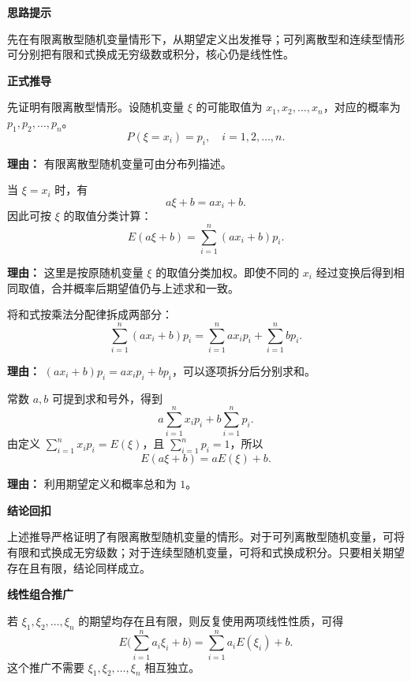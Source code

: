 \begin{proofbox}
	\textbf{\textcolor{CProof}{思路提示}}

	先在有限离散型随机变量情形下，从期望定义出发推导；可列离散型和连续型情形可分别把有限和式换成无穷级数或积分，核心仍是线性性。

	\medskip
	\textbf{\textcolor{CProof}{正式推导}}
	\begin{description}[style=nextline, leftmargin=2.8em, labelsep=0.5em, itemsep=0.55em]
		\item[\textbf{步骤一（设分布列）：}] 先证明有限离散型情形。设随机变量 $\xi$ 的可能取值为 $x_1,x_2,\dots,x_n$，对应的概率为 $p_1,p_2,\dots,p_n$。
		      \[
			      P(\xi=x_i)=p_i,\quad i=1,2,\dots,n.
		      \]
		      \par\textbf{理由：} 有限离散型随机变量可由分布列描述。

		\item[\textbf{步骤二（按原变量取值分类）：}] 当 $\xi=x_i$ 时，有
		      \[
			      a\xi+b=ax_i+b.
		      \]
		      因此可按 $\xi$ 的取值分类计算：
		      \[
			      E(a\xi+b)=\sum_{i=1}^{n}(ax_i+b)p_i.
		      \]
		      \par\textbf{理由：} 这里是按原随机变量 $\xi$ 的取值分类加权。即使不同的 $x_i$ 经过变换后得到相同取值，合并概率后期望值仍与上述求和一致。

		\item[\textbf{步骤三（拆分求和）：}] 将和式按乘法分配律拆成两部分：
		      \[
			      \sum_{i=1}^{n}(ax_i+b)p_i
			      =
			      \sum_{i=1}^{n}a x_i p_i+\sum_{i=1}^{n}b p_i.
		      \]
		      \par\textbf{理由：} $(ax_i+b)p_i = a x_i p_i+bp_i$，可以逐项拆分后分别求和。

		\item[\textbf{步骤四（化简代回）：}] 常数 $a,b$ 可提到求和号外，得到
		      \[
			      a\sum_{i=1}^{n}x_i p_i + b\sum_{i=1}^{n}p_i.
		      \]
		      由定义 $\sum_{i=1}^{n} x_i p_i = E(\xi)$，且 $\sum_{i=1}^{n} p_i = 1$，所以
		      \[
			      E(a\xi+b)=aE(\xi)+b.
		      \]
		      \par\textbf{理由：} 利用期望定义和概率总和为 $1$。
	\end{description}

	\medskip
	\textbf{\textcolor{CProof}{结论回扣}}

	上述推导严格证明了有限离散型随机变量的情形。对于可列离散型随机变量，可将有限和式换成无穷级数；对于连续型随机变量，可将和式换成积分。只要相关期望存在且有限，结论同样成立。

	\medskip
	\textbf{\textcolor{CProof}{线性组合推广}}

	若 $\xi_1,\xi_2,\dots,\xi_n$ 的期望均存在且有限，则反复使用两项线性性质，可得
	\[
		E\bigl(\sum_{i=1}^n a_i\xi_i+b\bigr)
		=
		\sum_{i=1}^n a_iE(\xi_i)+b.
	\]
	这个推广不需要 $\xi_1,\xi_2,\dots,\xi_n$ 相互独立。
\end{proofbox}